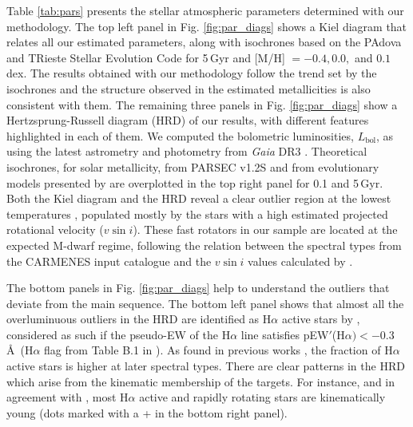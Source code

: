 Table \ref{tab:pars} presents the stellar atmospheric parameters determined with our methodology. The top left panel in Fig. \ref{fig:par_diags} shows a Kiel diagram that relates all our estimated parameters, along with isochrones based on the  PAdova and TRieste Stellar Evolution Code \citep[PARSEC release v1.2S;][]{parsec2012} for 5\,Gyr and [M/H] $=-0.4, 0.0,$ and $0.1$\,dex. The results obtained with our methodology follow the trend set by the isochrones and the structure observed in the estimated metallicities is also consistent with them. The remaining three panels in Fig. \ref{fig:par_diags} show a Hertzsprung-Russell diagram (HRD) of our results, with different features highlighted in each of them. We computed the bolometric luminosities, $\textit{L}_{\mathrm{bol}}$, as \citet{cifuentes2020} using the latest astrometry and photometry from {\it Gaia} DR3 \citep{gaiadr3}. Theoretical isochrones, for solar metallicity, from PARSEC v1.2S and from evolutionary models presented by \citet{baraffe2015} are overplotted in the top right panel for 0.1 and 5\,Gyr. Both the Kiel diagram and the HRD reveal a clear outlier region at the lowest temperatures \citep[mid M-dwarf regime;][]{cifuentes2020,pecaut2013}, populated mostly by the stars with a high estimated projected rotational velocity ($\textit{v}\sin{i}$). These fast rotators in our sample are located at the expected M-dwarf regime, following the relation between the spectral types from the CARMENES input catalogue \citep[Carmencita; ][]{alonsofloriano2015,caballero2016a} and the $\textit{v}\sin{i}$ values calculated by \citet{reiners2018} .

The bottom panels in Fig. \ref{fig:par_diags} help to understand the outliers that deviate from the main sequence. The bottom left panel shows that almost all the overluminuous outliers in the HRD are identified as H$\alpha$ active stars by \citet{schofer2019}, considered as such if the pseudo-EW of the H$\alpha$ line satisfies pEW$'$(H$\alpha)<-0.3$\,\AA~(H$\alpha$ flag from Table B.1 in ). As found in previous works \citep[e.g. ][]{jeffers2018,reiners2018}, the fraction of H$\alpha$ active stars is higher at later spectral types. There are clear patterns in the HRD which arise from the kinematic membership of the targets. For instance, and in agreement with \citet{jeffers2018}, most H$\alpha$ active and rapidly rotating stars are kinematically young (dots marked with a + in the bottom right panel).

